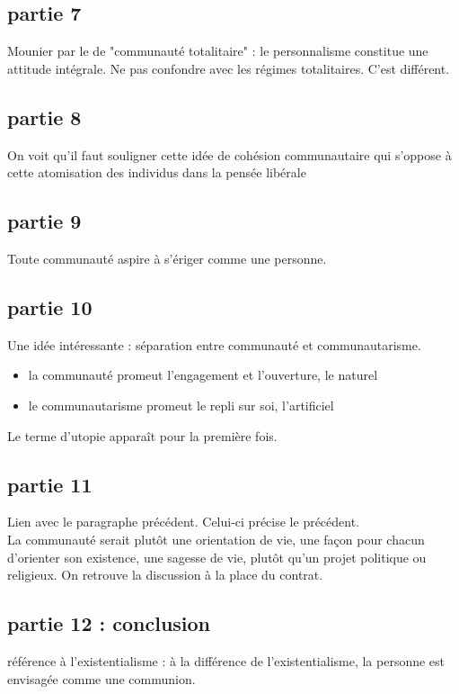 \subsection{partie 7}
Mounier par le de "communauté totalitaire" : le personnalisme constitue une attitude intégrale. Ne pas confondre avec les régimes totalitaires. C'est différent.

\subsection{partie 8}
On voit qu'il faut souligner cette idée de cohésion communautaire qui s'oppose à cette atomisation des individus dans la pensée libérale

\subsection{partie 9}
Toute communauté aspire à s'ériger comme une personne.

\subsection{partie 10}
Une idée intéressante : séparation entre communauté et communautarisme.
\begin{itemize}
    \item la communauté promeut l'engagement et l'ouverture, le naturel
    \item le communautarisme promeut le repli sur soi, l'artificiel
\end{itemize}
Le terme d'utopie apparaît pour la première fois.

\subsection{partie 11}

Lien avec le paragraphe précédent. Celui-ci précise le précédent.\\
La communauté serait plutôt une orientation de vie, une façon pour chacun d'orienter son existence, une sagesse de vie, plutôt  qu'un projet politique ou religieux. On retrouve la discussion à la place du contrat.

\subsection{partie 12 : conclusion}
référence à l'existentialisme : à la différence de l'existentialisme, la personne est envisagée comme une communion.


